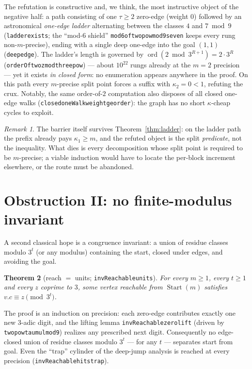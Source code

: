 \documentclass[11pt]{amsart}
\newtheorem{theorem}{Theorem}[section]
\theoremstyle{definition}
\theoremstyle{remark}
\newtheorem{remark}[theorem]{Remark}
\newcommand{\InvStart}{\operatorname{Start}}
\newcommand{\lean}[1]{{\def\_{\textunderscore\allowbreak}\texttt{#1}}}
\begin{document}
The refutation is constructive and, we think, the most instructive object of
the negative half: a path consisting of one $\tau\ge2$ zero-edge (weight $0$)
followed by an astronomical \emph{one-edge ladder} alternating between the
classes $4$ and $7 \bmod 9$ (\lean{ladder\_exists}; the ``mod-6 shield''
\lean{mod6\_of\_two\_pow\_mod9\_seven} keeps every rung non-$m$-precise),
ending with a single deep one-edge into the goal $(1,1)$
(\lean{deep\_edge}).  The ladder's length is governed by
$\operatorname{ord}(2 \bmod 3^{R+1}) = 2\cdot 3^{R}$
(\lean{orderOf\_two\_zmod\_three\_pow}) --- about $10^{22}$ rungs already at
the $m=2$ precision --- yet it exists \emph{in closed form}: no enumeration
appears anywhere in the proof.  On this path every $m$-precise split point
forces a suffix with $\kappa_2 = 0 < 1$, refuting the crux.  Notably, the
same
order-of-$2$ computation also disposes of all closed one-edge walks
(\lean{closed\_oneWalk\_weight\_ge\_order}): the graph has no short
$\kappa$-cheap cycles to exploit.

\begin{remark}
The barrier itself survives Theorem~\ref{thm:ladder}: on the ladder path the
prefix already pays $\kappa_1 \ge m$, and the refuted object is the split
\emph{predicate}, not the inequality.  What dies is every decomposition whose
split point is required to be $m$-precise; a viable induction would have to
locate the per-block increment elsewhere, or the route must be abandoned.
\end{remark}

\section{Obstruction II: no finite-modulus invariant}\label{sec:reach}

A second classical hope is a congruence invariant: a union of residue
classes modulo $3^t$ (or any modulus) containing the start, closed under
edges, and avoiding the goal.

\begin{theorem}[reach $=$ units; \lean{invReachable\_units}]\label{thm:reach}
For every $m \ge 1$, every $t \ge 1$ and every $z$ coprime to $3$, some
vertex reachable from $\InvStart(m)$ satisfies $v.c \equiv z \pmod{3^t}$.
\end{theorem}

The proof is an induction on precision: each zero-edge contributes exactly
one new $3$-adic digit, and the lifting lemma \lean{invReachable\_zero\_lift}
(driven by \lean{two\_pow\_tau\_mul\_mod9}) realizes any prescribed next
digit.  Consequently no edge-closed union of residue classes modulo
$3^{t}$ --- for any $t$ --- separates start from goal.  Even the ``trap''
cylinder
of the deep-jump analysis is reached at every precision
(\lean{invReachable\_hits\_trap}).
\end{document}
